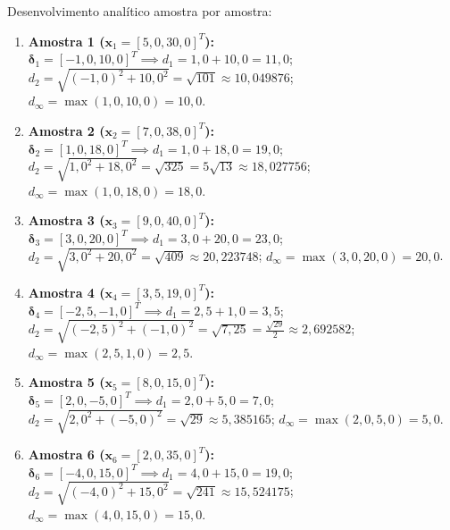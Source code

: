 \documentclass[11pt,a4paper]{article}
\begin{document}
Desenvolvimento analítico amostra por amostra:
\begin{enumerate}
    \item \textbf{Amostra 1 ($\mathbf{x}_1 = [5{,}0, 30{,}0]^T$):} $\boldsymbol{\delta}_1 = [-1{,}0, 10{,}0]^T \implies d_1 = 1{,}0 + 10{,}0 = 11{,}0$; $d_2 = \sqrt{(-1{,}0)^2 + 10{,}0^2} = \sqrt{101} \approx 10{,}049876$; $d_\infty = \max(1{,}0, 10{,}0) = 10{,}0$.
    \item \textbf{Amostra 2 ($\mathbf{x}_2 = [7{,}0, 38{,}0]^T$):} $\boldsymbol{\delta}_2 = [1{,}0, 18{,}0]^T \implies d_1 = 1{,}0 + 18{,}0 = 19{,}0$; $d_2 = \sqrt{1{,}0^2 + 18{,}0^2} = \sqrt{325} = 5\sqrt{13} \approx 18{,}027756$; $d_\infty = \max(1{,}0, 18{,}0) = 18{,}0$.
    \item \textbf{Amostra 3 ($\mathbf{x}_3 = [9{,}0, 40{,}0]^T$):} $\boldsymbol{\delta}_3 = [3{,}0, 20{,}0]^T \implies d_1 = 3{,}0 + 20{,}0 = 23{,}0$; $d_2 = \sqrt{3{,}0^2 + 20{,}0^2} = \sqrt{409} \approx 20{,}223748$; $d_\infty = \max(3{,}0, 20{,}0) = 20{,}0$.
    \item \textbf{Amostra 4 ($\mathbf{x}_4 = [3{,}5, 19{,}0]^T$):} $\boldsymbol{\delta}_4 = [-2{,}5, -1{,}0]^T \implies d_1 = 2{,}5 + 1{,}0 = 3{,}5$; $d_2 = \sqrt{(-2{,}5)^2 + (-1{,}0)^2} = \sqrt{7{,}25} = \frac{\sqrt{29}}{2} \approx 2{,}692582$; $d_\infty = \max(2{,}5, 1{,}0) = 2{,}5$.
    \item \textbf{Amostra 5 ($\mathbf{x}_5 = [8{,}0, 15{,}0]^T$):} $\boldsymbol{\delta}_5 = [2{,}0, -5{,}0]^T \implies d_1 = 2{,}0 + 5{,}0 = 7{,}0$; $d_2 = \sqrt{2{,}0^2 + (-5{,}0)^2} = \sqrt{29} \approx 5{,}385165$; $d_\infty = \max(2{,}0, 5{,}0) = 5{,}0$.
    \item \textbf{Amostra 6 ($\mathbf{x}_6 = [2{,}0, 35{,}0]^T$):} $\boldsymbol{\delta}_6 = [-4{,}0, 15{,}0]^T \implies d_1 = 4{,}0 + 15{,}0 = 19{,}0$; $d_2 = \sqrt{(-4{,}0)^2 + 15{,}0^2} = \sqrt{241} \approx 15{,}524175$; $d_\infty = \max(4{,}0, 15{,}0) = 15{,}0$.
\end{enumerate}
\end{document}
